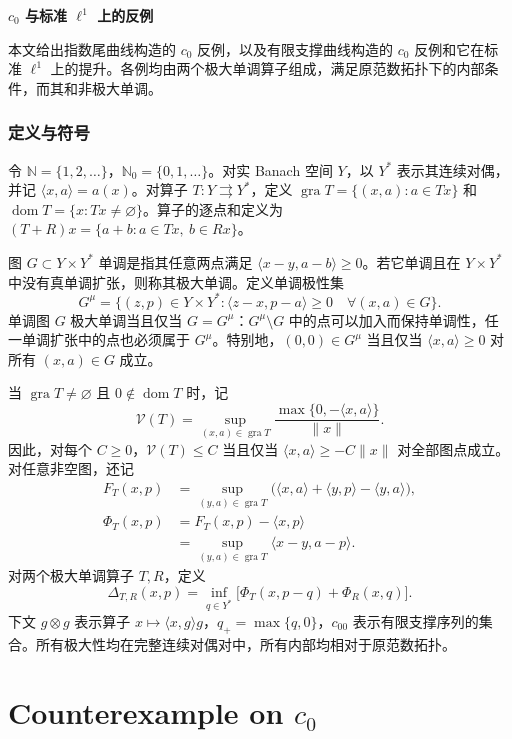 \documentclass[UTF8,fontset=fandol,11pt,a4paper]{ctexart}
\date{}
\begin{document}
\begin{center}
{\Large\bfseries $c_0$ 与标准 $\ell^1$ 上的反例}\par\medskip
\end{center}

本文给出指数尾曲线构造的 $c_0$ 反例，以及有限支撑曲线构造的 $c_0$ 反例和它在标准 $\ell^1$ 上的提升。各例均由两个极大单调算子组成，满足原范数拓扑下的内部条件，而其和非极大单调。

\section*{定义与符号}

令 $\mathbb N=\{1,2,\ldots\}$，$\mathbb N_0=\{0,1,\ldots\}$。对实 Banach 空间 $Y$，以 $Y^*$ 表示其连续对偶，并记 $\langle x,a\rangle=a(x)$。对算子 $T:Y\rightrightarrows Y^*$，定义 $\operatorname{gra}T=\{(x,a):a\in Tx\}$ 和 $\operatorname{dom}T=\{x:Tx\ne\varnothing\}$。算子的逐点和定义为 $(T+R)x=\{a+b:a\in Tx,\ b\in Rx\}$。

图 $G\subset Y\times Y^*$ 单调是指其任意两点满足 $\langle x-y,a-b\rangle\ge0$。若它单调且在 $Y\times Y^*$ 中没有真单调扩张，则称其极大单调。定义单调极性集
\[
G^\mu=\{(z,p)\in Y\times Y^*:
\langle z-x,p-a\rangle\ge0\quad\forall(x,a)\in G\}.
\]
单调图 $G$ 极大单调当且仅当 $G=G^\mu$：$G^\mu\setminus G$ 中的点可以加入而保持单调性，任一单调扩张中的点也必须属于 $G^\mu$。特别地，$(0,0)\in G^\mu$ 当且仅当 $\langle x,a\rangle\ge0$ 对所有 $(x,a)\in G$ 成立。

当 $\operatorname{gra}T\ne\varnothing$ 且 $0\notin\operatorname{dom}T$ 时，记
\[
\mathcal V(T)=\sup_{(x,a)\in\operatorname{gra}T}
\frac{\max\{0,-\langle x,a\rangle\}}{\|x\|}.
\]
因此，对每个 $C\ge0$，$\mathcal V(T)\le C$ 当且仅当 $\langle x,a\rangle\ge-C\|x\|$ 对全部图点成立。对任意非空图，还记
\[
\begin{aligned}
F_T(x,p)&=\sup_{(y,a)\in\operatorname{gra}T}
\bigl(\langle x,a\rangle+\langle y,p\rangle-\langle y,a\rangle\bigr),\\
\Phi_T(x,p)&=F_T(x,p)-\langle x,p\rangle\\
&=\sup_{(y,a)\in\operatorname{gra}T}\langle x-y,a-p\rangle.
\end{aligned}
\]
对两个极大单调算子 $T,R$，定义
\[
\Delta_{T,R}(x,p)=\inf_{q\in Y^*}
\bigl[\Phi_T(x,p-q)+\Phi_R(x,q)\bigr].
\]
下文 $g\otimes g$ 表示算子 $x\mapsto\langle x,g\rangle g$，$q_+=\max\{q,0\}$，$c_{00}$ 表示有限支撑序列的集合。所有极大性均在完整连续对偶对中，所有内部均相对于原范数拓扑。

\part*{Counterexample on $c_0$}
\end{document}
